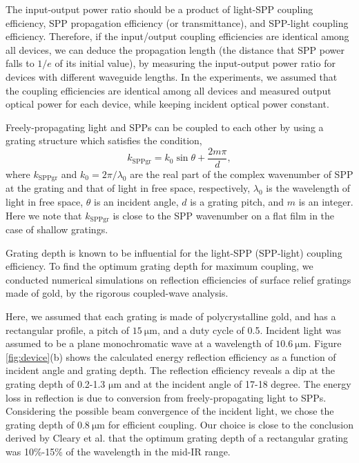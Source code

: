 \documentclass[aip,apl,reprint]{revtex4-1}
\begin{document}
The input-output power ratio should be a product of light-SPP coupling efficiency, SPP propagation efficiency (or transmittance), and SPP-light coupling efficiency. Therefore, if the input/output coupling efficiencies are identical among all devices, we can deduce the propagation length (the distance that SPP power falls to $1/e$ of its initial value), by measuring the input-output power ratio for devices with different waveguide lengths.  In the experiments, we assumed that the coupling efficiencies are identical among all devices and measured output optical power for each device, while keeping incident optical power constant. 

Freely-propagating light and SPPs can be coupled to each other by using a grating structure which satisfies the condition\cite{Koev},
\begin{equation}
k_{\mathrm{SPPgr}}=k_0 \sin \theta + \frac{2m\pi}{d},
\label{eq:phase-match}
\end{equation}
where $k_{\mathrm{SPPgr}}$ and $k_0=2\pi/\lambda_0$ are the real part of the complex wavenumber of SPP at the grating and that of light in free space, respectively, $\lambda_0$ is the wavelength of light in free space, $\theta$ is an incident angle, $d$ is a grating pitch, and $m$ is an integer. Here we note that $k_{\mathrm{SPPgr}}$ is close to the SPP wavenumber on a flat film in the case of shallow gratings.

Grating depth is known to be influential for the light-SPP (SPP-light) coupling efficiency\cite{Koev, Cleary2010}. To find the optimum grating depth for maximum coupling, we conducted numerical simulations on reflection efficiencies of surface relief gratings made of gold, by the rigorous coupled-wave analysis\cite{Moharam}. 

Here, we assumed that each grating is made of polycrystalline gold, and has a rectangular profile, a pitch of $15\:\mathrm{\mu m}$, and a duty cycle of 0.5. Incident light was assumed to be a plane monochromatic wave at a wavelength of $10.6\:\mathrm{\mu m}$. 
Figure \ref{fig:device}(b) shows the calculated energy reflection efficiency as a function of incident angle and grating depth. The reflection efficiency reveals a dip at the grating depth of 0.2-1.3 $\mathrm{\mu m}$ and at the incident angle of 17-18 degree. The energy loss in reflection is due to conversion from freely-propagating light to SPPs.
Considering the possible beam convergence of the incident light, we chose the grating depth of $0.8\:\mathrm{\mu m}$ for efficient coupling. Our choice is close to the conclusion derived by Cleary et al.\cite{Cleary2010} that the optimum grating depth of a rectangular grating was 10\%-15\% of the wavelength in the mid-IR range.
\end{document}
